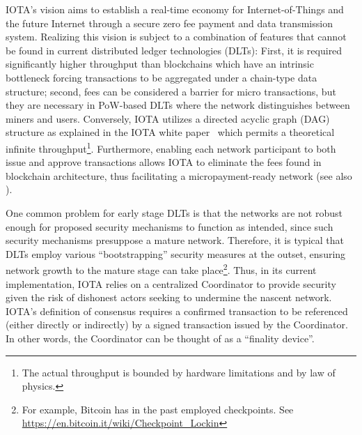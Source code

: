 \documentclass[../main.tex]{subfiles}
\begin{document}
IOTA's vision aims to establish a real-time economy for Internet-of-Things and the future Internet through a secure zero fee payment and data transmission system.
Realizing this vision is subject to a combination of features that cannot be found in current distributed ledger technologies (DLTs): First, it is required significantly higher throughput than blockchains which have an intrinsic bottleneck forcing transactions to be aggregated under a chain-type data structure; second, fees can be considered a barrier for micro transactions, but they are necessary in PoW-based DLTs where the network distinguishes between miners and users.
Conversely, IOTA utilizes a directed acyclic graph (DAG) structure as explained in the IOTA white paper~\cite{popov2018} which permits a theoretical infinite throughput\footnote{The actual throughput is bounded by hardware limitations and by law of physics.}. Furthermore, enabling each network participant to both issue and approve transactions allows IOTA to eliminate the fees found in blockchain architecture, thus facilitating a micropayment-ready network (see also \cite{popov2019feelessfree}).


One common problem for early stage DLTs is that the networks are not robust enough for proposed security mechanisms to function as intended, since such security mechanisms presuppose a mature network. Therefore, it is typical that DLTs employ various ``bootstrapping'' security measures at the outset, ensuring network growth to the mature stage can take place\footnote{For example, Bitcoin has in the past employed checkpoints. See \url{https://en.bitcoin.it/wiki/Checkpoint_Lockin}}. Thus, in its current implementation, IOTA relies on a centralized Coordinator to provide security given the risk of dishonest actors seeking to undermine the nascent network. IOTA's definition of consensus requires a confirmed transaction to be referenced (either directly or indirectly) by a signed transaction issued by the Coordinator. In other words, the Coordinator can be thought of as a ``finality device''.
\end{document}
